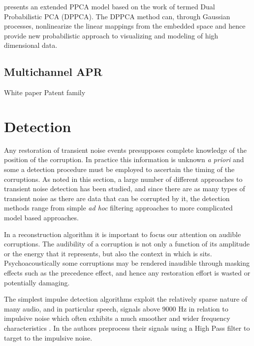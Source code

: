 \cite{Lawrence2005} presents an extended PPCA model based on the work of \cite{Tipping1999} termed Dual Probabilistic PCA (DPPCA). The DPPCA method can, through Gaussian processes, nonlinearize the linear mappings from the embedded space and hence provide new probabilistic approach to visualizing and modeling of high dimensional data.

\subsection{Multichannel APR}
White paper \cite{TouchSystems2006}
Patent family \cite{US7411581}

\section{Detection}\label{sec:LitRev_Detection}
Any restoration of transient noise events presupposes complete knowledge of the position of the corruption. In practice this information is unknown \emph{a priori} and some a detection procedure must be employed to ascertain the timing of the corruptions. As noted in this section, a large number of different approaches to transient noise detection has been studied, and since there are as many types of transient noise as there are data that can be corrupted by it, the  detection methods range from simple \emph{ad hoc} filtering approaches to more complicated model based approaches.

In a reconstruction algorithm it is important to focus our attention on audible corruptions. The audibility of a corruption is not only a function of its amplitude or the energy that it represents, but also the context in which is sits. Psychoacoustically some corruptions may be rendered inaudible through masking effects such as the precedence effect, and hence any restoration effort is wasted or potentially damaging.

The simplest impulse detection algorithms exploit the relatively sparse nature of many audio, and in particular speech, signals above 9000 Hz in relation to impulsive noise which often exhibits a much smoother and wider frequency characteristics \cite{Subramanya2007}. In \cite{Kasparis1993}\cite{US6795559} the authors preprocess their signals using a High Pass filter to target to the impulsive noise.

